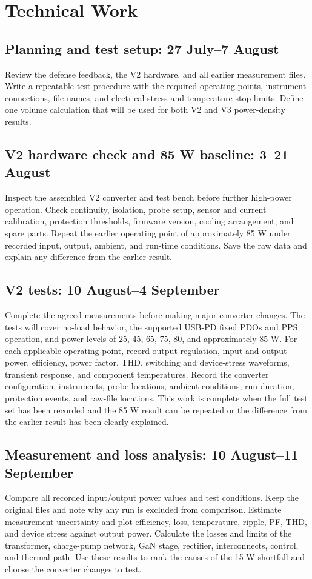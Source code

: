 \documentclass[12pt,a4paper]{report}
\begin{document}
\section{Technical Work}

\subsection*{Planning and test setup: 27 July--7 August}
    Review the defense feedback, the V2 hardware, and all earlier measurement files. Write a repeatable test procedure with the required operating points, instrument connections, file names, and electrical-stress and temperature stop limits. Define one volume calculation that will be used for both V2 and V3 power-density results.

\subsection*{V2 hardware check and 85 W baseline: 3--21 August}
    Inspect the assembled V2 converter and test bench before further high-power operation. Check continuity, isolation, probe setup, sensor and current calibration, protection thresholds, firmware version, cooling arrangement, and spare parts. Repeat the earlier operating point of approximately 85 W under recorded input, output, ambient, and run-time conditions. Save the raw data and explain any difference from the earlier result.

\subsection*{V2 tests: 10 August--4 September}
    Complete the agreed measurements before making major converter changes. The tests will cover no-load behavior, the supported USB-PD fixed PDOs and PPS operation, and power levels of 25, 45, 65, 75, 80, and approximately 85 W. For each applicable operating point, record output regulation, input and output power, efficiency, power factor, THD, switching and device-stress waveforms, transient response, and component temperatures. Record the converter configuration, instruments, probe locations, ambient conditions, run duration, protection events, and raw-file locations. This work is complete when the full test set has been recorded and the 85 W result can be repeated or the difference from the earlier result has been clearly explained.

\subsection*{Measurement and loss analysis: 10 August--11 September}
    Compare all recorded input/output power values and test conditions. Keep the original files and note why any run is excluded from comparison. Estimate measurement uncertainty and plot efficiency, loss, temperature, ripple, PF, THD, and device stress against output power. Calculate the losses and limits of the transformer, charge-pump network, GaN stage, rectifier, interconnects, control, and thermal path. Use these results to rank the causes of the 15 W shortfall and choose the converter changes to test.
\end{document}
